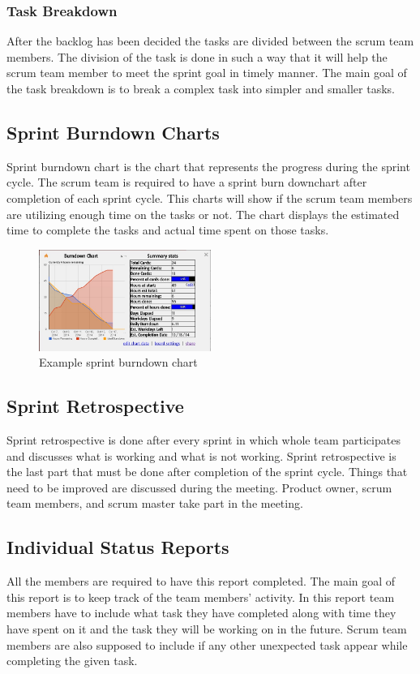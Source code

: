 \subsubsection{Task Breakdown}
After the backlog has been decided the tasks are divided between the scrum team members. The division of the task is done in such a way that it will help the scrum team member to meet the sprint goal in timely manner. The main goal of the task breakdown is to break a complex task into simpler and smaller tasks.

\subsection{Sprint Burndown Charts}
Sprint burndown chart is the chart that represents the progress during the sprint cycle. The scrum team is required to have a sprint burn downchart after completion of each sprint cycle. This charts will show if the scrum team members are utilizing enough time on the tasks or not. The chart displays the estimated time to complete the tasks and actual time spent on those tasks.

\begin{figure}[h!]
    \centering
    \includegraphics[width=0.5\textwidth]{images/sprint_burndown.jpg}
    \caption{Example sprint burndown chart}
\end{figure}

\subsection{Sprint Retrospective}
Sprint retrospective is done after every sprint in which whole team participates and discusses what is working and what is not working. Sprint retrospective is the last part that must be done after completion of the sprint cycle. Things that need to be improved are discussed during the meeting. Product owner, scrum team members, and scrum master take part in the  meeting. 

\subsection{Individual Status Reports}
All the members are required to have this report completed. The main goal of this report is to keep track of the team members' activity. In this report team members have to include what task they have completed along with time they have spent on it and the task they will be working on in the future. Scrum team members are also supposed to include if any other unexpected task appear while completing the given task.

